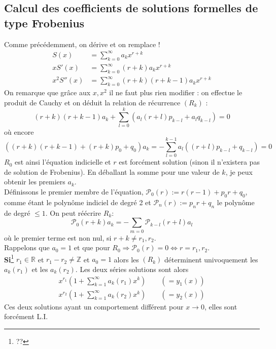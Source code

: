 	\setcounter{subsection}{3}
	\subsection{Calcul des coefficients de solutions formelles de type Frobenius}
	Comme précédemment, on dérive et on remplace ! 
	\begin{equation}
	\begin{array}{ll}
	S(x) &= \sum_{k=0}^\infty a_kx^{r+k}\\
	xS'(x) &= \sum_{k=0}^\infty (r+k)a_kx^{r+k}\\
	x^2S''(x) &= \sum_{k=0}	^\infty(r+k)(r+k-1)a_kx^{r+k}
	\end{array}
	\end{equation}		
	On remarque que grâce aux $x, x^2$ il ne faut plus rien modifier : on effectue 
	le produit de Cauchy et on déduit la relation de récurrence $(R_k)$ :
	\begin{equation}
	(r+k)(r+k-1)a_k + \sum_{l=0}^k(a_l(r+l)p_{k-l}+a_lq_{k-l})=0
	\end{equation}
	où encore 
	\begin{equation}
	((r+k)(r+k-1)+(r+k)p_0+q_0)a_k = -\sum_{l=0}^{k-1}a_l((r+l)p_{k-l}+q_{k-l})=0
	\end{equation}
	$R_0$ est ainsi l'équation indicielle et $r$ est forcément solution (sinon 
	il n'existera pas de solution de Frobenius). En déballant la somme pour 
	une valeur de $k$, je peux obtenir les premiers $a_k$.\\
	
	Définissons le premier membre de l'équation, $\mathcal{P}_0(r) := r(r-1)+p_0r
	+q_0$, comme étant le polynôme indiciel de degré 2 et $\mathcal{P}_n(r) := p_n
	r+q_n$ le polynôme de degré $\leq 1$. On peut réécrire $R_k$:
	\begin{equation}
	\mathcal{P}_0(r+k)a_k = -\sum_{m=0}\mathcal{P}_{k-l}(r+l)a_l
	\end{equation}
	où le premier terme est non nul, si $r+k\neq r_1,r_2$.\\
	Rappelons que $a_0=1$ et que pour $R_0 \Longrightarrow\mathcal{P}_0(r)=0 
	\Leftrightarrow r = r_1,r_2$.\\
	
	\textbf{Si}\footnote{??} $r_1\in\mathbb{R}$ et $r_1-r_2 \neq \mathbb{Z}$ et 
	$a_0=1$ alors les $(R_k)$ déterminent univoquement les $a_k(r_1)$ et les $a_k
	(r_2)$. Les deux séries solutions sont alors
	\begin{equation}
	\begin{array}{l}
	x^{r_1}(1+\sum_{k=1}^\infty a_k(r_1)x^k)\qquad(=y_1(x))\\
	x^{r_2}(1+\sum_{k=1}^\infty a_k(r_2)x^k)\qquad(=y_2(x))	
	\end{array}
	\end{equation}
	Ces deux solutions ayant un comportement différent pour $x\rightarrow0$, elles 
	sont forcément L.I.\\
	
